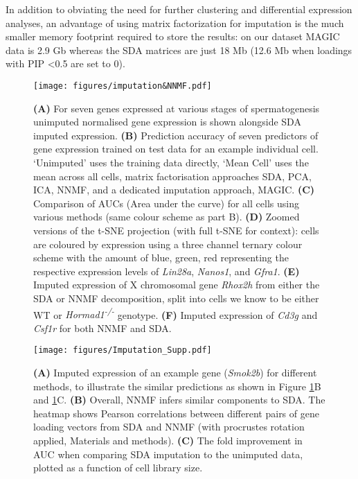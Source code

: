 In addition to obviating the need for further clustering and differential expression analyses, an advantage of using matrix factorization for imputation is the much smaller memory footprint required to store the results: on our dataset MAGIC data is 2.9 Gb whereas the SDA matrices are just 18 Mb (12.6 Mb when loadings with PIP <0.5 are set to 0).


\begin{figure}[H]
	\centering
	\texttt{[image: figures/imputation\&NNMF.pdf]}
	\caption{
		\textbf{(A)} For seven genes expressed at various stages of spermatogenesis unimputed normalised gene expression is shown alongside SDA imputed expression.
		\textbf{(B)} Prediction accuracy of seven predictors of gene expression trained on test data for an example individual cell. ‘Unimputed’ uses the training data directly, ‘Mean Cell’ uses the mean across all cells, matrix factorisation approaches SDA, PCA, ICA, NNMF, and a dedicated imputation approach, MAGIC.
		\textbf{(C)} Comparison of AUCs (Area under the curve) for all cells using various methods (same colour scheme as part B).
		\textbf{(D)} Zoomed versions of the t-SNE projection (with full t-SNE for context): cells are coloured by expression using a three channel ternary colour scheme with the amount of blue, green, red representing the respective expression levels of \textit{Lin28a}, \textit{Nanos1}, and \textit{Gfra1}.
		\textbf{(E)} Imputed expression of X chromosomal gene \textit{Rhox2h} from either the SDA or NNMF decomposition, split into cells we know to be either WT or \textit{Hormad1\textsuperscript{-/-}} genotype.
		\textbf{(F)} Imputed expression of \textit{Cd3g} and \textit{Csf1r} for both NNMF and SDA.}
	\label{fig:imputation}
\end{figure}

\begin{figure}[H]
	\centering
	\texttt{[image: figures/Imputation\_Supp.pdf]}
	\caption{
		\textbf{(A)} Imputed expression of an example gene (\textit{Smok2b}) for different methods, to illustrate the similar predictions as shown in Figure \ref{fig:imputation}B and \ref{fig:imputation}C.
		\textbf{(B)} Overall, NNMF infers similar components to SDA. The heatmap shows Pearson correlations between different pairs of gene loading vectors from SDA and NNMF (with procrustes rotation applied, Materials and methods).
		\textbf{(C)} The fold improvement in AUC when comparing SDA imputation to the unimputed data, plotted as a function of cell library size.
	}
	\label{fig:imputation_supp}
\end{figure}

